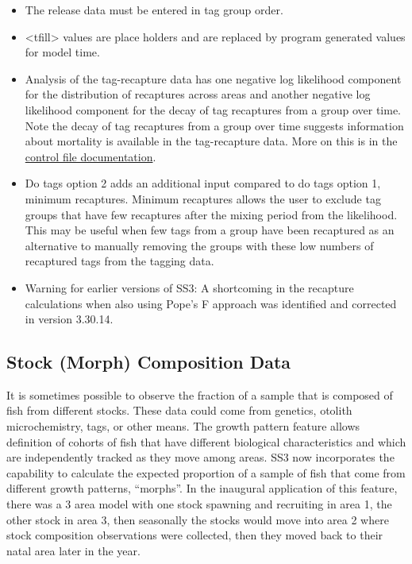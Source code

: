 	\begin{itemize}
		\item The release data must be entered in tag group order.
		\item <tfill> values are place holders and are replaced by program generated values for model time.
		\item Analysis of the tag-recapture data has one negative log likelihood component for the distribution of recaptures across areas and another negative log likelihood component for the decay of tag recaptures from a group over time. Note the decay of tag recaptures from a group over time suggests information about mortality is available in the tag-recapture data. More on this is in the \hyperlink{tagrecapture}{control file documentation}.
		\item  Do tags option 2 adds an additional input compared to do tags option 1, minimum recaptures. Minimum recaptures allows the user to exclude tag groups that have few recaptures after the mixing period from the likelihood. This may be useful when few tags from a group have been recaptured as an alternative to manually removing the groups with these low numbers of recaptured tags from the tagging data.
		\item Warning for earlier versions of SS3: A shortcoming in the recapture calculations when also using Pope's F approach was identified and corrected in version 3.30.14.
	\end{itemize}

\subsection{Stock (Morph) Composition Data}
It is sometimes possible to observe the fraction of a sample that is composed of fish from different stocks. These data could come from genetics, otolith microchemistry, tags, or other means.  The growth pattern feature allows definition of cohorts of fish that have different biological characteristics and which are independently tracked as they move among areas. SS3 now incorporates the capability to calculate the expected proportion of a sample of fish that come from different growth patterns, ``morphs''. In the inaugural application of this feature, there was a 3 area model with one stock spawning and recruiting in area 1, the other stock in area 3, then seasonally the stocks would move into area 2 where stock composition observations were collected, then they moved back to their natal area later in the year.

